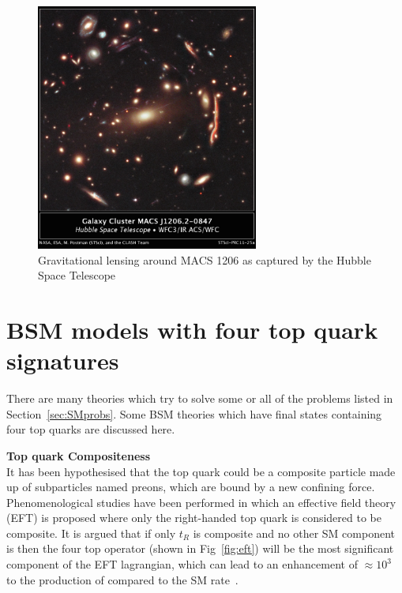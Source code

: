 \begin{figure}[ht!]
\centering
    \includegraphics[width=0.65\textwidth]{images/Theory/lensing2.jpg}
    \caption{Gravitational lensing around MACS 1206 as captured by the Hubble Space Telescope~\cite{Glens}}
    \label{fig:Glens}
\end{figure}


\section{BSM models with four top quark signatures ~\label{sec:BSMmodels}}

There are many theories which try to solve some or all of the problems listed in Section~\ref{sec:SMprobs}. Some BSM theories which have final states containing four top quarks are discussed here. 

\textbf{Top quark Compositeness}\\
It has been hypothesised that the top quark could be a composite particle made up of subparticles named preons, which are bound by a new confining force. Phenomenological studies have been performed in which an effective field theory (EFT) is proposed where only the right-handed top quark is considered to be composite. It is argued that if only $t_{R}$ is composite and no other SM component is then the four top operator (shown in Fig~\ref{fig:eft}) will be the most significant component of the EFT lagrangian, which can lead to an enhancement of $\approx 10^3$ to the production of \tttt compared to the SM rate~\cite{Tait2topcomp,Tait1topcomp}.

